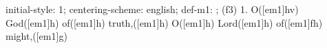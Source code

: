 initial-style: 1;
centering-scheme: english;
def-m1: \grealign;
(f3) 1. O([em1]hv) God([em1]h) of([em1]h) truth,([em1]h) O([em1]h) Lord([em1]h) of([em1]fh) might,([em1]g)